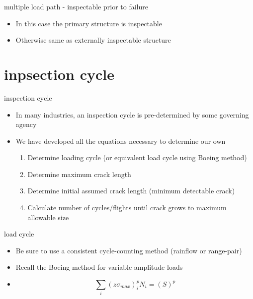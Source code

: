 \documentclass[10pt]{beamer}
\begin{document}
	\begin{frame}{multiple load path - inspectable prior to failure}
		\begin{itemize}[<+->]
			\item In this case the primary structure is inspectable
			\item Otherwise same as externally inspectable structure
		\end{itemize}
	\end{frame}
	
	\section{inpsection cycle}
	
	\begin{frame}{inspection cycle}
		\begin{itemize}[<+->]
			\item In many industries, an inspection cycle is pre-determined by some governing agency
			\item We have developed all the equations necessary to determine our own
			\begin{enumerate}
				\item Determine loading cycle (or equivalent load cycle using Boeing method)
				\item Determine maximum crack length
				\item Determine initial assumed crack length (minimum detectable crack)
				\item Calculate number of cycles/flights until crack grows to maximum allowable size
			\end{enumerate}
		\end{itemize}
	\end{frame}
	
	\begin{frame}{load cycle}
		\begin{itemize}[<+->]
			\item Be sure to use a consistent cycle-counting method (rainflow or range-pair)
			\item Recall the Boeing method for variable amplitude loads
			\item[] \begin{equation}
			\sum_i \left( z\sigma_{max} \right)_i^{p}N_i = \left( S \right)^{p}
			\end{equation}	
		\end{itemize}
	\end{frame}
	
\end{document}
